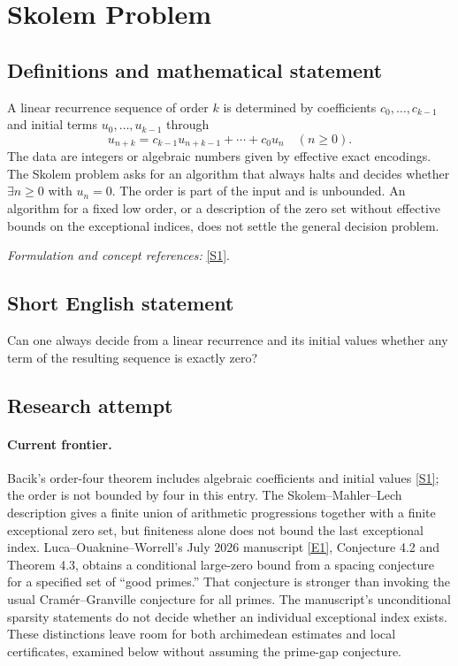 \documentclass[11pt,a4paper]{article}
\newcommand{\sref}[2]{\hyperlink{source:#1:#2}{[S#2]}}
\newcommand{\eref}[2]{\hyperlink{extra:#1:#2}{[E#2]}}
\newif\ifshowcatalogue
\newcommand{\cataloguescope}[1]{\ifshowcatalogue
 \paragraph{Exact scope in the supplied catalogue.}
 \begin{quote}\small #1\end{quote}\fi}
\begin{document}
\setcounter{section}{0}
\clearpage
\section*{\texorpdfstring{Skolem Problem}{Skolem Problem}}\label{statement}
\subsection{Definitions and mathematical statement}
A linear recurrence sequence of order $k$ is determined by coefficients $c_0,\ldots,c_{k-1}$ and initial terms $u_0,\ldots,u_{k-1}$ through
\[
 u_{n+k}=c_{k-1}u_{n+k-1}+\cdots+c_0u_n\quad(n\ge0).
\]
The data are integers or algebraic numbers given by effective exact encodings. The Skolem problem asks for an algorithm that always halts and decides whether $\exists n\ge0$ with $u_n=0$. The order is part of the input and is unbounded. An algorithm for a fixed low order, or a description of the zero set without effective bounds on the exceptional indices, does not settle the general decision problem.
\par\smallskip\textit{Formulation and concept references:} \sref{statement}{1}.
\cataloguescope{Decide algorithmically, given an integer (or algebraic) linear recurrence sequence, whether it has a zero term.}
\subsection{Short English statement}
Can one always decide from a linear recurrence and its initial values whether any term of the resulting sequence is exactly zero?
\subsection{Research attempt}

\paragraph{Current frontier.}
Bacik's order-four theorem includes algebraic coefficients and initial
values \sref{statement}{1}; the order is not bounded by four in this entry.
The Skolem--Mahler--Lech description gives a finite union of arithmetic
progressions together with a finite exceptional zero set, but finiteness
alone does not bound the last exceptional index. Luca--Ouaknine--Worrell's
July 2026 manuscript \eref{statement}{1}, Conjecture 4.2 and Theorem 4.3, obtains
a conditional large-zero bound from a spacing conjecture for a specified
set of ``good primes.'' That conjecture is stronger than invoking the
usual Cram\'er--Granville conjecture for all primes. The manuscript's
unconditional sparsity statements do not decide whether an individual
exceptional index exists. These distinctions leave room for both
archimedean estimates and local certificates, examined below without
assuming the prime-gap conjecture.
\end{document}
